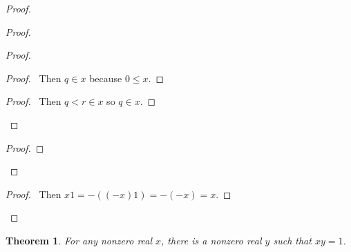 \documentclass{article}
\let\qed\relax
\newtheorem{theorem}[axiom]{Theorem}
\theoremstyle{definition}
\begin{document}
    \begin{proof}
        \pf
        \begin{proof}
            \begin{proof}
                \begin{proof}
                    \pf\ Then $q \in x$ because $0 \leq x$.
                \end{proof}
                \begin{proof}
                    \pf\ Then $q < r \in x$ so $q \in x$.
                \end{proof}
            \end{proof}
            \begin{proof}
            \end{proof}
        \end{proof}
        \begin{proof}
            \pf\ Then $x1 = -((-x)1) = -(-x) = x$.
        \end{proof}
        \qed
    \end{proof}

    \begin{theorem}
        For any nonzero real $x$, there is a nonzero real $y$ such that $xy = 1$.
    \end{theorem}
\end{document}
